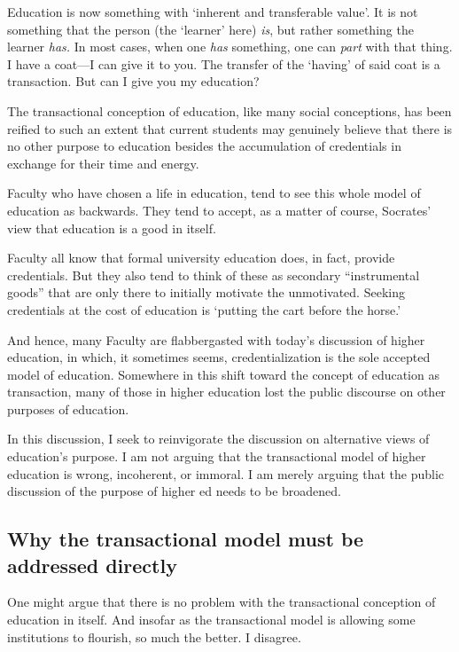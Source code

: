 Education is now something with `inherent and transferable value'. It is not something that the person (the `learner' here) \emph{is}, but rather something the learner \emph{has.} In most cases, when one \emph{has} something, one can \emph{part} with that thing. I have a coat---I can give it to you. The transfer of the `having' of said coat is a transaction. But can I give you my education?

The transactional conception of education, like many social conceptions, has been reified to such an extent that current students may genuinely believe that there is no other purpose to education besides the accumulation of credentials in exchange for their time and energy.

Faculty who have chosen a life in education, tend to see this whole model of education as backwards. They tend to accept, as a matter of course, Socrates' view that education is a good in itself.

Faculty all know that formal university education does, in fact, provide credentials. But they also tend to think of these as secondary ``instrumental goods'' that are only there to initially motivate the unmotivated. Seeking credentials at the cost of education is `putting the cart before the horse.'

And hence, many Faculty are flabbergasted with today's discussion of higher education, in which, it sometimes seems, credentialization is the sole accepted model of education. Somewhere in this shift toward the concept of education as transaction, many of those in higher education lost the public discourse on other purposes of education. 

In this discussion, I seek to reinvigorate the discussion on alternative views of education's purpose. I am not arguing that the transactional model of higher education is wrong, incoherent, or immoral. I am merely arguing that the public discussion of the purpose of higher ed needs to be broadened.

\subsection{Why the transactional model must be addressed directly}
\label{whythetransactionalmodelmustbeaddresseddirectly}

One might argue that there is no problem with the transactional conception of education in itself. And insofar as the transactional model is allowing some institutions to flourish, so much the better. I disagree. 

